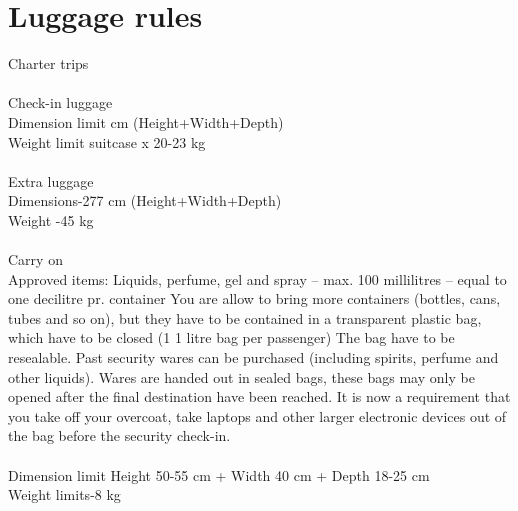 \section{Luggage rules}
Charter trips\\
\\
Check-in luggage\\
Dimension limit\indent\indent{} cm (Height+Width+Depth)
\\
Weight limit\indent\indent\indent{} suitcase x 20-23 kg
\\
\\
Extra luggage\\
Dimensions\indent\indent\indent{}-277 cm (Height+Width+Depth)\\
Weight \indent\indent\indent \indent{}-45 kg
\\
\\
Carry on\\
Approved items: Liquids, perfume, gel and spray – max. 100 millilitres – equal to one decilitre pr. container
You are allow to bring more containers (bottles, cans, tubes and so on), but they have to be contained in a transparent plastic bag, which have to be closed (1 1 litre bag per passenger)
The bag have to be resealable.
Past security wares can be purchased (including spirits, perfume and other liquids). Wares are handed out in sealed bags, these bags may only be opened after the final destination have been reached.
It is now a requirement that you take off your overcoat, take laptops and other larger electronic devices out of the bag before the security check-in.
\\
\\
Dimension limit \indent\indent\indent	Height 50-55 cm + Width 40 cm + Depth 18-25 cm
\\
Weight limits\indent\indent\indent{}-8 kg